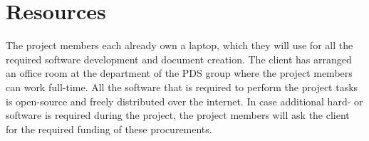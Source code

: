 \section{Resources}
The project members each already own a laptop, which they will use for all the required software development and document creation. The client has arranged an office room at the department of the PDS group where the project members can work full-time. All the software that is required to perform the project tasks is open-source and freely distributed over the internet. In case additional hard- or software is required during the project, the project members will ask the client for the required funding of these procurements.